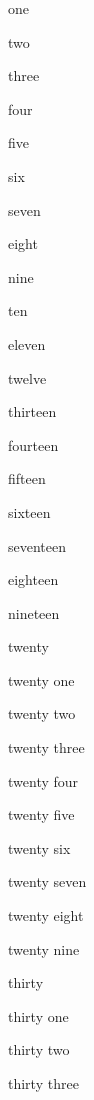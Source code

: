 \documentclass[
  letterpaper,
]{article}
\begin{document}
one

{\textcolor[HTML]{E60000}{two}}

{\textcolor[HTML]{FF9900}{three}}

{\textcolor[HTML]{FFFF00}{four}}

{\textcolor[HTML]{008A00}{five}}

{\textcolor[HTML]{0066CC}{six}}

{\textcolor[HTML]{9933FF}{seven}}

{\textcolor[HTML]{FFFFFF}{eight}}

{\textcolor[HTML]{FACCCC}{nine}}

{\textcolor[HTML]{FFEBCC}{ten}}

{\textcolor[HTML]{FFFFCC}{eleven}}

{\textcolor[HTML]{CCE8CC}{twelve}}

{\textcolor[HTML]{CCE0F5}{thirteen}}

{\textcolor[HTML]{EBD6FF}{fourteen}}

{\textcolor[HTML]{BBBBBB}{fifteen}}

{\textcolor[HTML]{F06666}{sixteen}}

{\textcolor[HTML]{FFC266}{seventeen}}

{\textcolor[HTML]{FFFF66}{eighteen}}

{\textcolor[HTML]{66B966}{nineteen}}

{\textcolor[HTML]{66A3E0}{twenty}}

{\textcolor[HTML]{C285FF}{twenty one}}

{\textcolor[HTML]{888888}{twenty two}}

{\textcolor[HTML]{A10000}{twenty three}}

{\textcolor[HTML]{B26B00}{twenty four}}

{\textcolor[HTML]{B2B200}{twenty five}}

\newpage

{\textcolor[HTML]{006100}{twenty six}}

{\textcolor[HTML]{0047B2}{twenty seven}}

\newpage

{\textcolor[HTML]{6B24B2}{twenty eight}}

{\textcolor[HTML]{444444}{twenty nine}}

{\textcolor[HTML]{5C0000}{thirty}}

{\textcolor[HTML]{663D00}{thirty one}}

{\textcolor[HTML]{666600}{thirty two}}

{\textcolor[HTML]{003700}{thirty three}}
\end{document}
